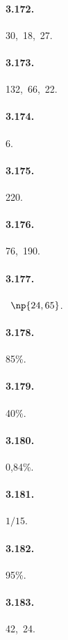 \begin{multicols}{3}
\paragraph{3.172.} 30,~18,~27.

\paragraph{3.173.} 132,~66,~22.

\paragraph{3.174.} 6.

\paragraph{3.175.} 220.

\paragraph{3.176.} 76,~190.

\paragraph{3.177.} \officialeuro~$\np{24,65}$.

\paragraph{3.178.} 85\%.

\paragraph{3.179.} 40\%.

\paragraph{3.180.} 0,84\%.

\paragraph{3.181.} $ 1/15 $.

\paragraph{3.182.} 95\%.

\paragraph{3.183.} 42,~24.


\end{multicols}
